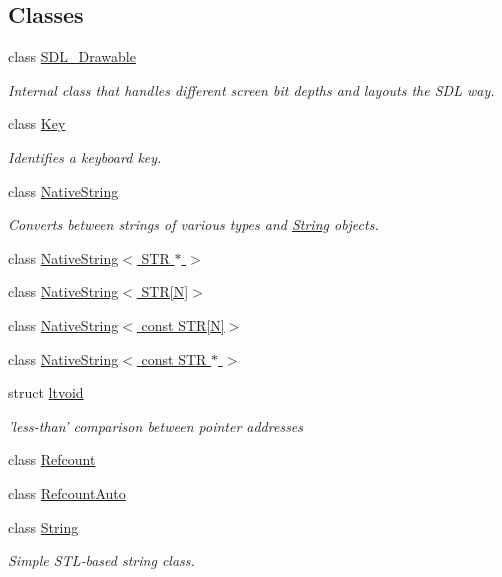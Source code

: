 \subsection*{Classes}
\begin{DoxyCompactItemize}
\item 
class \hyperlink{classGUI_1_1SDL__Drawable}{S\-D\-L\-\_\-\-Drawable}
\begin{DoxyCompactList}\small\item\em Internal class that handles different screen bit depths and layouts the S\-D\-L way. \end{DoxyCompactList}\item 
class \hyperlink{classGUI_1_1Key}{Key}
\begin{DoxyCompactList}\small\item\em Identifies a keyboard key. \end{DoxyCompactList}\item 
class \hyperlink{classGUI_1_1NativeString}{Native\-String}
\begin{DoxyCompactList}\small\item\em Converts between strings of various types and \hyperlink{classGUI_1_1String}{String} objects. \end{DoxyCompactList}\item 
class \hyperlink{classGUI_1_1NativeString_3_01STR_01_5_01_4}{Native\-String$<$ S\-T\-R $\ast$ $>$}
\item 
class \hyperlink{classGUI_1_1NativeString_3_01STR[N]_4}{Native\-String$<$ S\-T\-R\mbox{[}\-N\mbox{]}$>$}
\item 
class \hyperlink{classGUI_1_1NativeString_3_01const_01STR[N]_4}{Native\-String$<$ const S\-T\-R\mbox{[}\-N\mbox{]}$>$}
\item 
class \hyperlink{classGUI_1_1NativeString_3_01const_01STR_01_5_01_4}{Native\-String$<$ const S\-T\-R $\ast$ $>$}
\item 
struct \hyperlink{structGUI_1_1ltvoid}{ltvoid}
\begin{DoxyCompactList}\small\item\em 'less-\/than' comparison between pointer addresses \end{DoxyCompactList}\item 
class \hyperlink{classGUI_1_1Refcount}{Refcount}
\item 
class \hyperlink{classGUI_1_1RefcountAuto}{Refcount\-Auto}
\item 
class \hyperlink{classGUI_1_1String}{String}
\begin{DoxyCompactList}\small\item\em Simple S\-T\-L-\/based string class. \end{DoxyCompactList}\item 

\end{DoxyCompactItemize}

